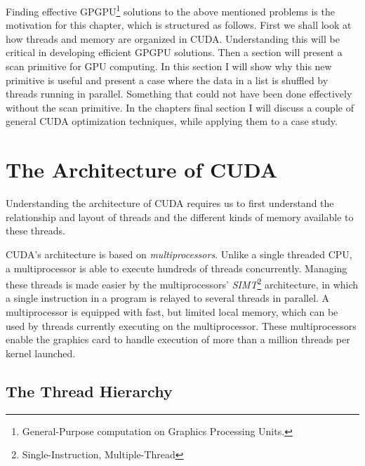 


Finding effective GPGPU\footnote{General-Purpose computation on Graphics
  Processing Units.} solutions to the above mentioned problems is the motivation
for this chapter, which is structured as follows. First we shall look at how
threads and memory are organized in CUDA. Understanding this will be critical in
developing efficient GPGPU solutions. Then a section will present a scan
primitive for GPU computing. In this section I will show why this new primitive
is useful and present a case where the data in a list is shuffled by threads
running in parallel. Something that could not have been done effectively without
the scan primitive. In the chapters final section I will discuss a couple of
general CUDA optimization techniques, while applying them to a case study.

\section{The Architecture of CUDA}

Understanding the architecture of CUDA requires us to first understand the
relationship and layout of threads and the different kinds of memory available
to these threads.

CUDA's architecture is based on \textit{multiprocessors}. Unlike a single
threaded CPU, a multiprocessor is able to execute hundreds of threads
concurrently. Managing these threads is made easier by the multiprocessors'
\textit{SIMT}\footnote{Single-Instruction, Multiple-Thread} architecture, in
which a single instruction in a program is relayed to several threads in
parallel. A multiprocessor is equipped with fast, but limited local memory,
which can be used by threads currently executing on the multiprocessor. These
multiprocessors enable the graphics card to handle execution of more than a
million threads per kernel launched.


\subsection{The Thread Hierarchy}\label{sec:threadHierarchy}



